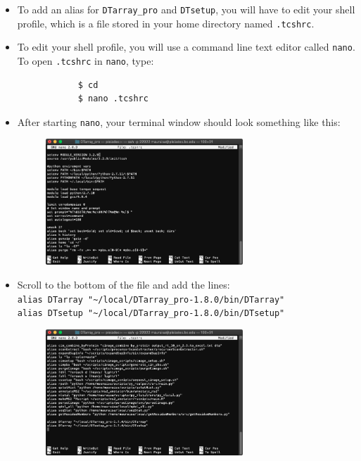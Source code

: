 \documentclass[12pt]{article}
\newcommand{\VERSION}{1.8.0}
\begin{document}
	\begin{itemize}
		\item To add an alias for \texttt{DTarray\_pro} and \texttt{DTsetup}, you will have to edit your shell profile, which is a file stored in your home directory named \texttt{.tcshrc}.
		
		\item To edit your shell profile, you will use a command line text editor called \texttt{nano}. To open \texttt{.tcshrc} in \texttt{nano}, type:
		
		\begin{lstlisting}
			$ cd
			$ nano .tcshrc
		\end{lstlisting}
		
		\item After starting \texttt{nano}, your terminal window should look something like this:
		
		\begin{figure}[h!]
			\centering
			\includegraphics[width=0.7\textwidth]{step_1.png}
		\end{figure}
		
		\item Scroll to the bottom of the file and add the lines: \\
		\texttt{alias DTarray "\textasciitilde/local/DTarray\_pro-\VERSION/bin/DTarray"} \\
		\texttt{alias DTsetup "\textasciitilde/local/DTarray\_pro-\VERSION/bin/DTsetup"}		
		
		\begin{figure}[h!]
			\centering
			\includegraphics[width=0.7\textwidth]{step_2.png}
		\end{figure}
	

\end{itemize}
\end{document}

